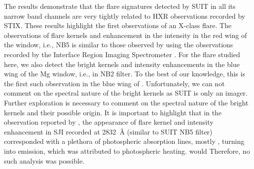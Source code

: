 The results demonstrate that the flare signatures detected by SUIT in all its narrow band channels are very tightly related to HXR observations recorded by STIX. These results highlight the first {\suit} observations of an X-class flare. The observations of flare kernels and enhancement in the intensity in the red wing of the  window, i.e., NB5 is similar to those observed by \cite{kowalski19,kowalski17,kleint17} using the observations recorded by the Interface Region Imaging Spectrometer \citep[IRIS,][]{iris}. For the flare studied here, we also detect the bright kernels and intensity enhancements in the blue wing of the Mg window, i.e., in NB2 filter. To the best of our knowledge, this is the first such observation in the blue wing of . Unfortunately, we can not comment on the spectral nature of the bright kernels as SUIT is only an imager. Further exploration is necessary to comment on the spectral nature of the bright kernels and their possible origin. It is important to highlight that in the observation reported by \cite{kowalski19}, the appearance of flare kernel and intensity enhancement in SJI recorded at 2832~{\AA} (similar to SUIT NB5 filter) corresponded with a plethora of photospheric absorption lines, mostly , turning into emission, which was attributed to photospheric heating.  would  Therefore, no such analysis was possible. 